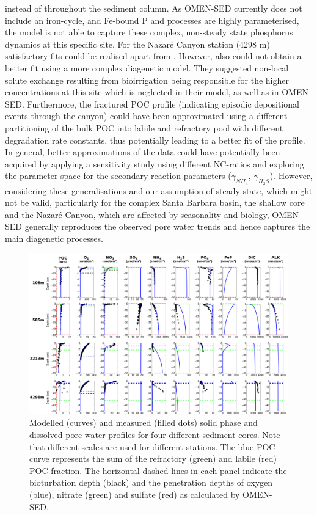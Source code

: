 \documentclass[gmd, manuscript]{copernicus}
\begin{document}
instead of throughout the sediment column. %
As OMEN-SED currently does not include an iron-cycle, and Fe-bound P and  processes are highly parameterised, the model is not able to capture these complex, non-steady state phosphorus 
dynamics at this specific site. 
For the Nazar\'e Canyon station (4298 m) satisfactory fits could be realised apart from . However, also \citet{epping_oxidation_2002} could not obtain a better fit 
using a more complex diagenetic model. They suggested non-local solute exchange resulting from bioirrigation being responsible for the higher  concentrations at this site which is neglected in their model, as well as in 
OMEN-SED. Furthermore, the fractured POC profile (indicating episodic depositional events through the canyon) could have been approximated using a different partitioning of the bulk POC into 
labile and refractory pool with different degradation rate constants, thus potentially leading to a better fit of the  profile.  
In general, better approximations of the data could have potentially been acquired by applying a sensitivity study using different NC-ratios \citep[e.g.][report different ratios from Redfield stoichiometry]{epping_oxidation_2002} 
and exploring the parameter space for the secondary reaction parameters ($\gamma_{NH_4}$, $\gamma_{H_2S}$). 
However, considering these generalisations and our assumption of steady-state, which might not be valid, particularly for the complex Santa Barbara basin, the shallow core and the Nazar\'e Canyon, which are affected by seasonality 
and biology, OMEN-SED generally reproduces the observed pore water trends and hence captures the main diagenetic processes. 

\begin{figure}
	\includegraphics[width=1.0\textwidth]{figures/Profiles/0_ALL_PROFILES_COMBINED_1503.pdf}
	\caption{Modelled (curves) and measured (filled dots) solid phase and dissolved pore water profiles for four different sediment cores. Note that different 
	scales are used for different stations. The blue POC curve represents the sum of the refractory (green) and labile (red) POC fraction. The horizontal dashed lines in each panel indicate the 
	bioturbation depth (black) and the penetration depths of oxygen (blue), nitrate (green) and sulfate (red) as calculated by OMEN-SED.}
	\label{fig:Sediment_profiles}
\end{figure}
\end{document}
